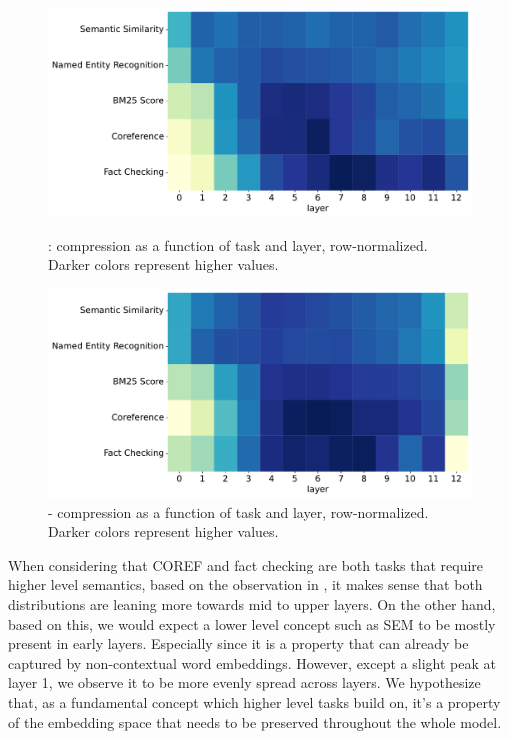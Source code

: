 \begin{figure}[!h]
    \includegraphics[width=\textwidth]{gfx/probing/heatmap_compression_base}
    \caption{: compression as a function of task and layer, row-normalized. Darker colors represent higher values.}
    \label{fig:heatmap_comp_base}

    \includegraphics[width=\textwidth]{gfx/probing/heatmap_compression_passage}
    \caption{ - compression as a function of task and layer, row-normalized. Darker colors represent higher values.}
    \label{fig:heatmap_comp_passage}
\end{figure}

When considering that COREF and fact checking are both tasks that require higher level semantics, based on the observation in \cite{tenney-etal-2019-bert}, it makes sense that both distributions are leaning more towards mid to upper layers. On the other hand, based on this, we would expect a lower level concept such as SEM to be mostly present in early layers. Especially since it is a property that can already be captured by non-contextual word embeddings. However, except a slight peak at layer 1, we observe it to be more evenly spread across layers. We hypothesize that, as a fundamental concept which higher level tasks build on, it's a property of the embedding space that needs to be preserved throughout the whole model.

